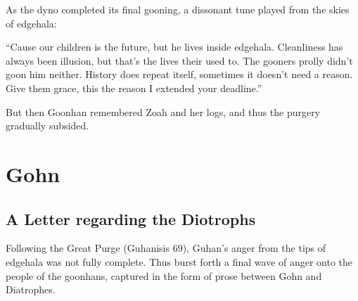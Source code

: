 \documentclass{article}
\begin{document}
As the dyno completed its final gooning, a dissonant tune played from the skies of edgehala:

“Cause our children is the future, but he lives inside edgehala. Cleanliness has always been illusion, but that's the lives their used to. The gooners prolly didn't goon him neither. History does repeat itself, sometimes it doesn't need a reason. Give them grace, this the reason I extended your deadline.”

But then Goonhan remembered Zoah and her logs, and thus the purgery gradually subsided.

\section{Gohn}

\subsection{A Letter regarding the Diotrophs}

Following the Great Purge (Guhanisis 69), Guhan’s anger from the tips of edgehala was not fully complete. Thus burst forth a final wave of anger onto the people of the goonhans, captured in the form of prose between Gohn and Diatrophes. 
\end{document}
